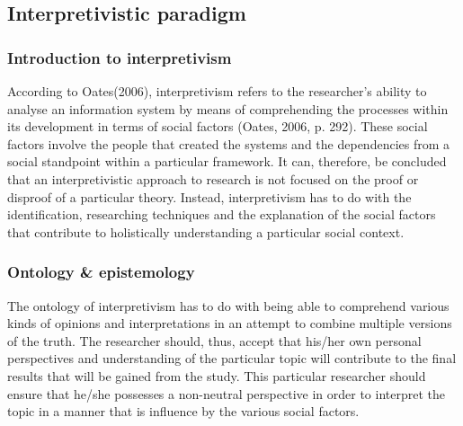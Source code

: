 \subsection{Interpretivistic paradigm}
\subsubsection{Introduction to interpretivism}
According to Oates(2006), interpretivism refers to the researcher’s ability to analyse an information system by means of comprehending the processes within its development in terms of social factors (Oates, 2006, p. 292). These social factors involve the people that created the systems and the dependencies from a social standpoint within a particular framework.
It can, therefore, be concluded that an interpretivistic approach to research is not focused on the proof or disproof of a particular theory. Instead, interpretivism has to do with the identification, researching techniques and the explanation of the social factors that contribute to holistically understanding a particular social context.
\subsubsection{Ontology \& epistemology}
The ontology of interpretivism has to do with being able to comprehend various kinds of opinions and interpretations in an attempt to combine multiple versions of the truth. The researcher should, thus, accept that his/her own personal perspectives and understanding of the particular topic will contribute to the final results that will be gained from the study.  This particular researcher should ensure that he/she possesses a non-neutral perspective in order to interpret the topic in a manner that is influence by the various social factors.
